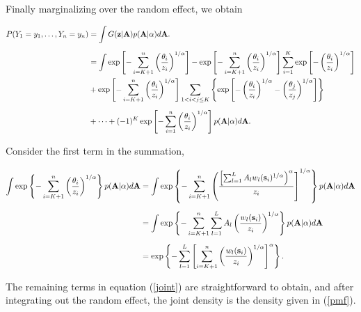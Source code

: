 \documentclass[11pt]{article}
\begin{document}
Finally marginalizing over the random effect, we obtain

\begin{align} \label{joint}
    P(Y_1=y_1,\ldots,Y_n=y_n) &=\int G(\mbox{\bf z} | \mbox{\bf A}) p( \mbox{\bf A} | \alpha) d\mbox{\bf A}. \nonumber\\[0.5em]
			&= \int \exp \left[ -\sum_{ i = K+1}^{ n }\left( \frac{ \theta_i }{ z_i } \right)^{1/\alpha} \right] - \exp \left[ -\sum_{ i = K+1}^{ n }\left( \frac{ \theta_i }{ z_i } \right)^{1/\alpha} \right] \sum_{ i = 1}^{K} \exp\left[ -\left( \frac{ \theta_i }{ z_i } \right)^{ 1/\alpha} \right] \nonumber\\
		&  + \exp \left[ -\sum_{ i = K+1}^{ n }\left( \frac{ \theta_i }{ z_i } \right)^{1/\alpha} \right] \sum_{ 1 < i < j \le K } \left\{ \exp \left[ - \left( \frac{ \theta_i }{ z_i } \right)^{ 1/\alpha} - \left( \frac{ \theta_j }{ z_j } \right)^{ 1/\alpha } \right] \right \} \nonumber \\[0.5em]
		& + \cdots + (-1)^K \exp\left[ - \sum_{ i = 1 }^{ n }\left( \frac{ \theta_i }{ z_i } \right)^{ 1/\alpha} \right] p( \mbox{\bf A} | \alpha) d\mbox{\bf A}.
\end{align}

Consider the first term in the summation,

\begin{align}
	\int \exp \left\{ -\sum_{ i = K+1}^{ n }\left( \frac{ \theta_i }{ z_i } \right)^{1/\alpha} \right\} p( \mbox{\bf A} | \alpha) d\mbox{\bf A} &= \int \exp \left\{ - \sum_{ i = K + 1 }^n \left( \frac{ \left[ \sum_{ l = 1 }^L  A_l w_{l}(\mbox{\bf s}_i)^{1/\alpha} \right)^\alpha }{ z_i} \right]^{ 1/\alpha } \right \} p( \mbox{\bf A} | \alpha) d\mbox{\bf A} \nonumber \\[0.5em]
	 &= \int \exp \left\{ -\sum_{ i = K + 1}^n \sum_{ l = 1}^L A_l \left( \frac{ w_l (\mbox{\bf s}_i) }{ z_i } \right)^{1/\alpha} \right \} p( \mbox{\bf A} | \alpha) d\mbox{\bf A} \nonumber \\[0.5em]
	 &=\exp\left\{-\sum_{ l = 1}^L \left[ \sum_{ i = K + 1 }^n \left( \frac{ w_l(\mbox{\bf s}_i)}{ z_i} \right)^{1/\alpha} \right]^\alpha \right\}.
\end{align}

The remaining terms in equation (\ref{joint}) are straightforward to obtain, and after integrating out the random effect, the joint density is the density given in (\ref{pmf}).
\end{document}
